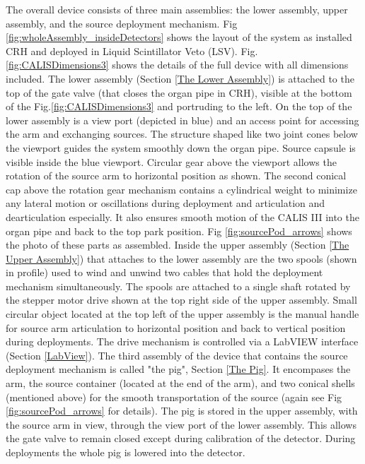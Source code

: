 The overall device consists of three main assemblies: the lower assembly, upper assembly, and the source deployment mechanism. Fig \ref{fig:wholeAssembly_insideDetectors} shows the layout of the system as installed CRH and deployed in Liquid Scintillator Veto (LSV). Fig. \ref{fig:CALISDimensions3} shows the details of the full device with all dimensions included. The lower assembly (Section \ref{The Lower Assembly}) is attached to the top of the gate valve (that closes the organ pipe in CRH), visible at the bottom of the Fig.\ref{fig:CALISDimensions3} and portruding to the left. On the top of the lower  assembly is a view port  (depicted in blue) and an access point for accessing the arm and exchanging sources. The structure shaped like two joint cones below the viewport guides the system smoothly down the organ pipe. Source capsule is visible inside the blue viewport. Circular gear above the viewport allows the rotation of the source arm to horizontal position as shown. The second conical cap above the rotation gear mechanism contains a cylindrical weight to minimize any lateral motion or oscillations during deployment and articulation and dearticulation especially. It also ensures smooth motion of the CALIS III into the organ pipe and back to the top park position. Fig \ref{fig:sourcePod_arrows} shows the photo of these parts as assembled. Inside the upper assembly (Section \ref{The Upper Assembly}) that attaches to the lower assembly are the two spools (shown in profile) used to wind and unwind two cables that hold the deployment mechanism simultaneously. The spools are attached to a single shaft rotated by the stepper motor drive shown at the top right side of the upper assembly. Small circular object located at the top left of the upper assembly is the manual handle for source arm articulation to horizontal position and back to vertical position during deployments.  The drive mechanism is controlled via a LabVIEW interface (Section \ref{LabView}).  The third assembly of the device that contains the source deployment mechanism is called "the pig", Section \ref{The Pig}. It encompases the arm, the source container (located at the end of the arm), and two conical shells (mentioned above) for the smooth transportation of the source  (again see Fig \ref{fig:sourcePod_arrows} for details). The pig is stored in the upper assembly, with the source arm in view, through the view port of the lower assembly. This allows the gate valve to remain closed except during calibration of the detector. During deployments the whole pig is lowered into the detector. 

